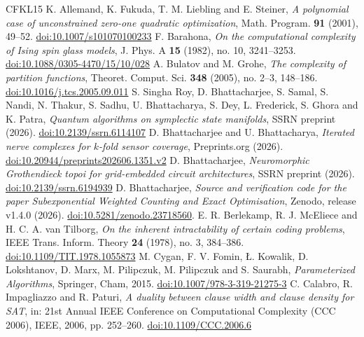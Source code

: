 \documentclass[11pt,reqno]{amsart}
\numberwithin{equation}{section}
\theoremstyle{plain}
\theoremstyle{definition}
\theoremstyle{remark}
\newcommand{\archiveline}{, release v1.4.0 (2026). \href{https://doi.org/10.5281/zenodo.23718560}{doi:10.5281/zenodo.23718560}}
\begin{document}
\begingroup\raggedright
\begin{thebibliography}{CFKL15}
 K. Allemand, K. Fukuda, T. M. Liebling and E. Steiner, \emph{A polynomial case of unconstrained zero-one quadratic optimization}, Math. Program. \textbf{91} (2001), 49--52. \href{https://doi.org/10.1007/s101070100233}{doi:10.1007/s101070100233}
 F. Barahona, \emph{On the computational complexity of Ising spin glass models}, J. Phys. A \textbf{15} (1982), no. 10, 3241--3253. \href{https://doi.org/10.1088/0305-4470/15/10/028}{doi:10.1088/0305-4470/15/10/028}
 A. Bulatov and M. Grohe, \emph{The complexity of partition functions}, Theoret. Comput. Sci. \textbf{348} (2005), no. 2--3, 148--186. \href{https://doi.org/10.1016/j.tcs.2005.09.011}{doi:10.1016/j.tcs.2005.09.011}
 S. Singha Roy, D. Bhattacharjee, S. Samal, S. Nandi, N. Thakur, S. Sadhu, U. Bhattacharya, S. Dey, L. Frederick, S. Ghora and K. Patra, \emph{Quantum algorithms on symplectic state manifolds}, SSRN preprint (2026). \href{https://doi.org/10.2139/ssrn.6114107}{doi:10.2139/ssrn.6114107}
 D. Bhattacharjee and U. Bhattacharya, \emph{Iterated nerve complexes for $k$-fold sensor coverage}, Preprints.org (2026). \href{https://doi.org/10.20944/preprints202606.1351.v2}{doi:10.20944/preprints202606.1351.v2}
 D. Bhattacharjee, \emph{Neuromorphic Grothendieck topoi for grid-embedded circuit architectures}, SSRN preprint (2026). \href{https://doi.org/10.2139/ssrn.6194939}{doi:10.2139/ssrn.6194939}
 D. Bhattacharjee, \emph{Source and verification code for the paper Subexponential Weighted Counting and Exact Optimisation}, Zenodo\archiveline.
 E. R. Berlekamp, R. J. McEliece and H. C. A. van Tilborg, \emph{On the inherent intractability of certain coding problems}, IEEE Trans. Inform. Theory \textbf{24} (1978), no. 3, 384--386. \href{https://doi.org/10.1109/TIT.1978.1055873}{doi:10.1109/TIT.1978.1055873}
 M. Cygan, F. V. Fomin, {\L}. Kowalik, D. Lokshtanov, D. Marx, M. Pilipczuk, M. Pilipczuk and S. Saurabh, \emph{Parameterized Algorithms}, Springer, Cham, 2015. \href{https://doi.org/10.1007/978-3-319-21275-3}{doi:10.1007/978-3-319-21275-3}
 C. Calabro, R. Impagliazzo and R. Paturi, \emph{A duality between clause width and clause density for SAT}, in: 21st Annual IEEE Conference on Computational Complexity (CCC 2006), IEEE, 2006, pp. 252--260. \href{https://doi.org/10.1109/CCC.2006.6}{doi:10.1109/CCC.2006.6}

\end{thebibliography}
\end{document}
